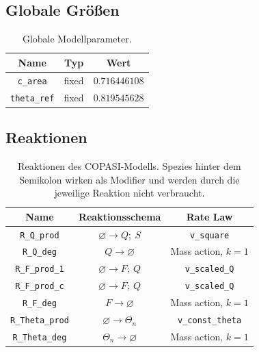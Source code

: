 \subsection{Globale Größen}

\begin{table}[h]
    \centering
    \begin{tabular}{c|c|c}
        Name & Typ & Wert \\
        \hline
        \texttt{c\_area} & fixed & \(0.716446108\) \\
        \texttt{theta\_ref} & fixed & \(0.819545628\) \\
    \end{tabular}
    \caption{Globale Modellparameter.}
    \label{tab:copasi_global_quantities}
\end{table}

\subsection{Reaktionen}

\begin{table}[H]
    \centering
    \begin{tabular}{c|c|c}
        Name & Reaktionsschema & Rate Law \\
        \hline
        \texttt{R\_Q\_prod} & \(\varnothing \rightarrow Q;\ S\) & \texttt{v\_square} \\
        \texttt{R\_Q\_deg} & \(Q \rightarrow \varnothing\) & Mass action, \(k=1\) \\
        \texttt{R\_F\_prod\_1} & \(\varnothing \rightarrow F;\ Q\) & \texttt{v\_scaled\_Q} \\
        \texttt{R\_F\_prod\_c} & \(\varnothing \rightarrow F;\ Q\) & \texttt{v\_scaled\_Q} \\
        \texttt{R\_F\_deg} & \(F \rightarrow \varnothing\) & Mass action, \(k=1\) \\
        \texttt{R\_Theta\_prod} & \(\varnothing \rightarrow \Theta_n\) & \texttt{v\_const\_theta} \\
        \texttt{R\_Theta\_deg} & \(\Theta_n \rightarrow \varnothing\) & Mass action, \(k=1\) \\
    \end{tabular}
    \caption{Reaktionen des COPASI-Modells. Spezies hinter dem Semikolon
    wirken als Modifier und werden durch die jeweilige Reaktion nicht
    verbraucht.}
    \label{tab:copasi_reactions}
\end{table}

